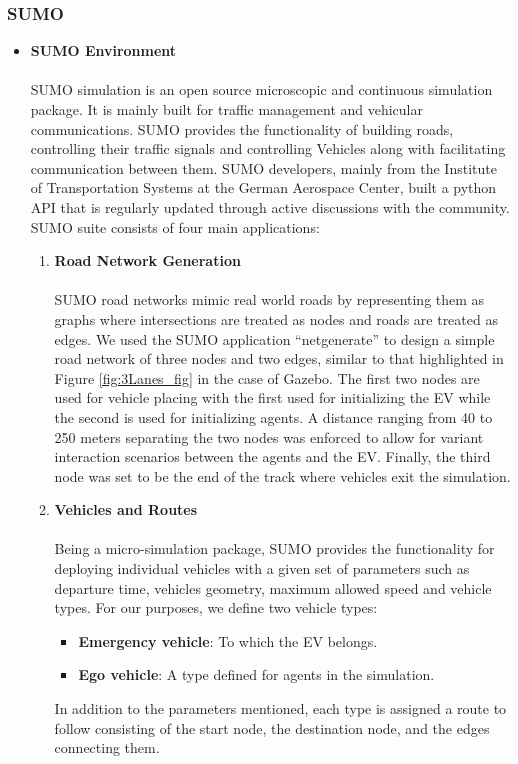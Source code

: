 \subsubsection{SUMO}
\begin{itemize}
    \item \textbf{SUMO Environment}
\\ \\SUMO simulation is an open source microscopic and continuous simulation package. It is mainly built for traffic management and vehicular communications. SUMO\cite{sumo_2012} provides the functionality of building roads, controlling their traffic signals and controlling Vehicles along with facilitating communication between them. SUMO developers, mainly from the  Institute of Transportation Systems at the German Aerospace Center, built a python API that is regularly updated through active discussions with the community. SUMO suite consists of four main applications:
\begin{enumerate}
    \item \textbf{Road Network Generation} 
    \\ \\SUMO road networks mimic real world roads by representing them as graphs where intersections are treated as nodes and roads are treated as edges. We used the SUMO application “netgenerate” to design a simple road network of three nodes and two edges, similar to that highlighted in Figure \ref{fig:3Lanes_fig} in the case of Gazebo. The first two nodes are used for vehicle placing with the first used for initializing the EV while the second is used for initializing agents. A distance ranging from 40 to 250 meters separating the two nodes was enforced to allow for variant interaction scenarios between the agents and the EV. Finally, the third node was set to be the end of the track where vehicles exit the simulation.\\
    
    \item \textbf{Vehicles and Routes}
    \\ \\Being a micro-simulation package, SUMO provides the functionality for deploying individual vehicles with a given set of parameters such as departure time, vehicles geometry, maximum allowed speed and vehicle types. For our purposes, we define two vehicle types:
    \begin{itemize}
        \item \textbf {Emergency vehicle}: To which the EV belongs. 
        \item \textbf {Ego vehicle}: A type defined for  agents in the simulation.
    \end{itemize}
	In addition to the parameters mentioned, each type is assigned a route to follow consisting of the start node, the destination node, and the edges connecting them.\\
	

\end{enumerate}
\end{itemize}
